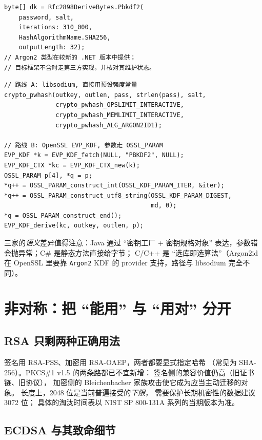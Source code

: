\documentclass[12pt,a4paper,fontset=fandol]{ctexbook}
\newcommand{\CSharp}{C\#}
\newcommand{\CppJava}{C/C++}
\begin{document}
\begin{lstlisting}[style=csharpstyle,caption={C\#：静态 Pbkdf2 与 Argon2 的存在性}]
byte[] dk = Rfc2898DeriveBytes.Pbkdf2(
    password, salt,
    iterations: 310_000,
    HashAlgorithmName.SHA256,
    outputLength: 32);
// Argon2 类型在较新的 .NET 版本中提供；
// 目标框架不含时走第三方实现，并核对其维护状态。
\end{lstlisting}

\begin{lstlisting}[caption={C/C++：libsodium 的 Argon2id 与 OpenSSL 的 PBKDF2}]
// 路线 A: libsodium, 直接用预设强度常量
crypto_pwhash(outkey, outlen, pass, strlen(pass), salt,
              crypto_pwhash_OPSLIMIT_INTERACTIVE,
              crypto_pwhash_MEMLIMIT_INTERACTIVE,
              crypto_pwhash_ALG_ARGON2ID1);

// 路线 B: OpenSSL EVP_KDF, 参数走 OSSL_PARAM
EVP_KDF *k = EVP_KDF_fetch(NULL, "PBKDF2", NULL);
EVP_KDF_CTX *kc = EVP_KDF_CTX_new(k);
OSSL_PARAM p[4], *q = p;
*q++ = OSSL_PARAM_construct_int(OSSL_KDF_PARAM_ITER, &iter);
*q++ = OSSL_PARAM_construct_utf8_string(OSSL_KDF_PARAM_DIGEST,
                                        md, 0);
*q = OSSL_PARAM_construct_end();
EVP_KDF_derive(kc, outkey, outlen, p);
\end{lstlisting}

三家的\emph{语义}差异值得注意：Java 通过 ``密钥工厂 + 密钥规格对象''
表达，参数错会抛异常；\CSharp{} 是静态方法直接给字节；
\CppJava{} 是 ``选库即选算法''（Argon2id 在 OpenSSL 里要靠
\texttt{Argon2} KDF 的 provider 支持，路径与 libsodium 完全不同）。

\section{非对称：把 ``能用'' 与 ``用对'' 分开}

\subsection{RSA 只剩两种正确用法}

签名用 RSA-PSS、加密用 RSA-OAEP，两者都要显式指定哈希
（常见为 SHA-256）。PKCS\#1 v1.5 的两条路都已不宜新增：
签名侧的兼容价值仍高（旧证书链、旧协议），
加密侧的 Bleichenbacher 家族攻击使它成为应当主动迁移的对象。
长度上，2048 位是当前普遍接受的\emph{下限}，
需要保护长期机密性的数据建议 3072 位；
具体的淘汰时间表以 NIST SP 800-131A 系列的当期版本为准。

\subsection{ECDSA 与其致命细节}
\end{document}
